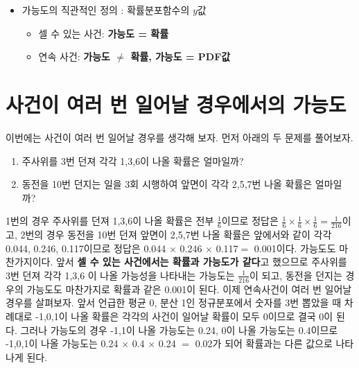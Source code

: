 \documentclass[]{book}
\providecommand{\tightlist}{%
  \setlength{\itemsep}{0pt}\setlength{\parskip}{0pt}}
\begin{document}
\begin{itemize}
\tightlist
\item
  가능도의 직관적인 정의 : 확률분포함수의 \(y\)값

  \begin{itemize}
  \tightlist
  \item
    셀 수 있는 사건: \textbf{가능도 = 확률}
  \item
    연속 사건: \textbf{가능도 \(\neq\) 확률, 가능도 = PDF값}
  \end{itemize}
\end{itemize}

\hypertarget{uxc0acuxac74uxc774-uxc5ecuxb7ec-uxbc88-uxc77cuxc5b4uxb0a0-uxacbduxc6b0uxc5d0uxc11cuxc758-uxac00uxb2a5uxb3c4}{%
\section{사건이 여러 번 일어날 경우에서의 가능도}\label{uxc0acuxac74uxc774-uxc5ecuxb7ec-uxbc88-uxc77cuxc5b4uxb0a0-uxacbduxc6b0uxc5d0uxc11cuxc758-uxac00uxb2a5uxb3c4}}

이번에는 사건이 여러 번 일어날 경우를 생각해 보자. 먼저 아래의 두 문제를 풀어보자.

\begin{enumerate}
\def\labelenumi{\arabic{enumi}.}
\tightlist
\item
  주사위를 3번 던져 각각 1,3,6이 나올 확률은 얼마일까?
\item
  동전을 10번 던지는 일을 3회 시행하여 앞면이 각각 2,5,7번 나올 확률은 얼마일까?
\end{enumerate}

1번의 경우 주사위를 던져 1,3,6이 나올 확률은 전부 \(\frac{1}{6}\)이므로 정답은 \(\frac{1}{6}\times\frac{1}{6}\times\frac{1}{6}=\frac{1}{216}\)이고, 2번의 경우 동전을 10번 던져 앞면이 2,5,7번 나올 확률은 앞에서와 같이 각각 0.044, 0.246, 0.117이므로 정답은 0.044 \(\times\) 0.246 \(\times\) 0.117\(=\) 0.001이다. 가능도도 마찬가지이다. 앞서 \textbf{셀 수 있는 사건에서는 확률과 가능도가 같다}고 했으므로 주사위를 3번 던져 각각 1,3,6 이 나올 가능성을 나타내는 가능도는 \(\frac{1}{216}\)이 되고, 동전을 던지는 경우의 가능도도 마찬가지로 확률과
같은 0.001이 된다. 이제 연속사건이 여러 번 일어날 경우를 살펴보자. 앞서 언급한 평균 0, 분산 1인 정규분포에서 숫자를 3번 뽑았을 때 차례대로 -1,0,1이 나올 확률은 각각의 사건이 일어날 확률이 모두 0이므로 결국 0이 된다. 그러나 가능도의 경우 -1,1이 나올 가능도는 0.24, 0이 나올 가능도는 0.4이므로 -1,0,1이 나올 가능도는 0.24 \(\times\) 0.4 \(\times\) 0.24 \(=\) 0.02가 되어 확률과는 다른 값으로 나타나게 된다.
\end{document}
